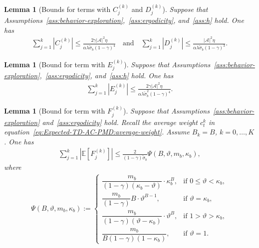 \documentclass[10pt]{article}
\newcommand{\calA}{\mathcal{A}}
\newcommand{\ls}{\left}
\newcommand{\rs}{\right}
\theoremstyle{plain}
\newtheorem{lemma}[theorem]{Lemma}
\theoremstyle{definition}
\begin{document}
\begin{lemma}[Bounds for terms with $C_j^{(k)}$ and $D_j^{(k)}$]\label{lem:expected-CjkDjk-bounds} Suppose that Assumptions~\ref{ass:behavior-exploration},~\ref{ass:ergodicity}, and~\ref{ass:h} hold. One has 
\begin{align*}
     \sum_{j=1}^k \ls| C_j^{(k)} \rs| \leq \frac{2\gamma |\calA|^2 \eta}{\alpha\lambda\tilde \sigma_b(1-\gamma)^4}\quad\mbox{and}\quad
     \sum_{j=1}^k \ls| D_j^{(k)} \rs| \leq \frac{|\calA|^2\eta}{\alpha\lambda\tilde \sigma_b(1-\gamma)^3}.
        \end{align*}
\end{lemma}

\begin{lemma}[Bound for term with $E_j^{(k)}$]\label{lem:expected-Ejk-bounds} Suppose that Assumptions~\ref{ass:behavior-exploration},~\ref{ass:ergodicity}, and~\ref{ass:h} hold. One has 
     \begin{align*}
        \sum_{j=1}^k \ls| E_j^{(k)} \rs| \leq \frac{2\gamma |\calA|^2 \eta}{\alpha\lambda\tilde\sigma_b^2 (1-\gamma)^4}.
    \end{align*}
\end{lemma}

\begin{lemma}[Bound for term with $F_j^{(k)}$]\label{lem:expected-Fjk-bounds} Suppose that Assumptions~\ref{ass:behavior-exploration} and~\ref{ass:ergodicity} hold. Recall the average weight $c_t^k$ in equation~\eqref{eq:Expected-TD-AC-PMD:average-weight}. Assume $B_k=B$, $k=0,\dots,K$. One has 
\begin{align*}
\sum_{j=1}^k\ls|\mathbb{E}\ls[F_j^{(k)}\rs]\rs|\leq \frac{2}{(1-\gamma)\tilde{\sigma}_b}\Psi({B},\vartheta,m_b,\kappa_b), 
\end{align*}
where 
\begin{align*}
 \Psi(B, \vartheta, m_b, \kappa_b) := \begin{cases}
            \dfrac{m_b}{(1-\gamma)(\kappa_b-\vartheta)} \cdot {\kappa_b^{B}}, & \mbox{if } 0 \leq \vartheta < \kappa_b, \\[1em]
            \dfrac{m_b}{(1-\gamma)} B \cdot \vartheta^{B - 1}, & \mbox{if } \vartheta = \kappa_b, \\[1em]
            \dfrac{m_b}{(1-\gamma)(\vartheta-\kappa_b)} \cdot {\vartheta^{B}}, & \mbox{if } 1 > \vartheta > \kappa_b, \\[1em]
            \dfrac{m_b}{B(1-\gamma)(1-\kappa_b)}, &\mbox{if } \vartheta = 1.
        \end{cases}
    \end{align*}
\label{lem:Expected-TD-AC-PMD:error-control}
\end{lemma}
\end{document}
